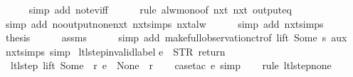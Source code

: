 \begin{isabellebody}
\ \ \ \ \isamarkupfalse%
\ {\isacharparenleft}simp\ add{\isacharcolon}\ not{\isacharunderscore}ev{\isacharunderscore}iff{\isacharparenright}\isanewline
\ \ \ \ \isamarkupfalse%
\ {\isacharparenleft}rule\ alw{\isacharunderscore}mono{\isacharbrackleft}of\ {\isachardoublequoteopen}nxt\ {\isacharparenleft}nxt\ {\isacharparenleft}output{\isacharunderscore}eq\ {\isacharbrackleft}{\isacharbrackright}{\isacharparenright}{\isacharparenright}{\isachardoublequoteclose}{\isacharbrackright}{\isacharparenright}\isanewline
\ \ \ \ \ \isamarkupfalse%
\ {\isacharparenleft}simp\ add{\isacharcolon}\ no{\isacharunderscore}output{\isacharunderscore}none{\isacharunderscore}nxt\ nxt{\isachardot}simps\ nxt{\isacharunderscore}alw{\isacharparenright}\isanewline
\ \ \ \ \isamarkupfalse%
\ {\isacharparenleft}simp\ add{\isacharcolon}\ nxt{\isachardot}simps{\isacharparenright}\isanewline
\ \ \isamarkupfalse%
\ {\isacharquery}thesis\isanewline
\ \ \ \ \isamarkupfalse%
\ assms\isanewline
\ \ \ \ \isamarkupfalse%
\ {\isacharparenleft}simp\ add{\isacharcolon}\ make{\isacharunderscore}full{\isacharunderscore}observation{\isachardot}ctr{\isacharbrackleft}of\ lift\ {\isachardoublequoteopen}Some\ s{\isachardoublequoteclose}{\isacharbrackright}\ aux{\isacharparenright}\isanewline
{}\isamarkupfalse%
%
\endisatagproof
{\isafoldproof}%
%
\isadelimproof
\isanewline
%
\endisadelimproof
\isanewline
{}\isamarkupfalse%
\ nxt{\isachardot}simps\ {\isacharbrackleft}simp{\isacharbrackright}\isanewline
\isanewline
{}\isamarkupfalse%
\ ltl{\isacharunderscore}step{\isacharunderscore}{}{\isacharunderscore}invalid{\isacharunderscore}label{\isacharcolon}\isanewline
{\isachardoublequoteopen}e\ {\isasymnoteq}\ {\isacharparenleft}STR\ {\isacharprime}{\isacharprime}return{\isacharprime}{\isacharprime}{\isacharcomma}\ {\isacharbrackleft}{\isacharbrackright}{\isacharparenright}\ {\isasymLongrightarrow}\isanewline
\ \ ltl{\isacharunderscore}step\ lift\ {\isacharparenleft}Some\ {}{\isacharparenright}\ r\ e\ {\isacharequal}\ {\isacharparenleft}None{\isacharcomma}\ {\isacharbrackleft}{\isacharbrackright}{\isacharcomma}\ r{\isacharparenright}{\isachardoublequoteclose}\isanewline
%
\isadelimproof
\ \ %
\endisadelimproof
%
\isatagproof
{}\isamarkupfalse%
\ {\isacharparenleft}case{\isacharunderscore}tac\ e{\isacharcomma}\ simp{\isacharparenright}\isanewline
\ \ \isamarkupfalse%
\ {\isacharparenleft}rule\ ltl{\isacharunderscore}step{\isacharunderscore}none{\isacharparenright}\isanewline

\end{isabellebody}
